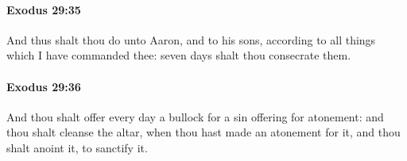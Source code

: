 		\paragraph{Exodus 29:35} %
			\label{EXODUS-29-35}

			And thus shalt thou do unto Aaron, and to his sons, according to all things which I have commanded thee: seven days shalt thou consecrate them.


		\paragraph{Exodus 29:36} %
			\label{EXODUS-29-36}

			And thou shalt offer every day a bullock for a sin offering for atonement: and thou shalt cleanse the altar, when thou hast made an atonement for it, and thou shalt anoint it, to sanctify it.



